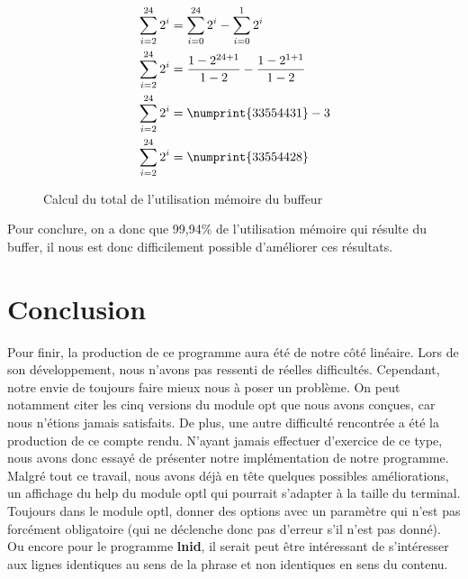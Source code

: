 \documentclass[12pt]{article}
\begin{document}
    \begin{figure}[H]
        \centering
        \begin{equation}
            \begin{split}
                & \sum_{i = 2}^{24} 2^i =  \sum_{i = 0}^{24} 2^i - 
                \sum_{i = 0}^{1} 2^i \\
                & \sum_{i = 2}^{24} 2^i = \dfrac{1 - 2^{24+1}}{1 - 2} - 
                \dfrac{1 - 2^{1+1}}{1 - 2} \\
                & \sum_{i = 2}^{24} 2^i = \numprint{33554431} - 3 \\
                & \sum_{i = 2}^{24} 2^i = \numprint{33554428} \\
            \end{split}
        \end{equation}
        \caption{Calcul du total de l'utilisation mémoire du buffeur}
    \end{figure}

    Pour conclure, on a donc que 99,94\% de l'utilisation mémoire qui résulte du
    buffer, il nous est donc difficilement possible d'améliorer ces résultats.

    \newpage

    \section{Conclusion}

    Pour finir, la production de ce programme aura été de notre côté linéaire. 
    Lors de son développement, nous n'avons pas ressenti de réelles difficultés. 
    Cependant, notre envie de toujours faire mieux nous à poser un problème. On 
    peut notamment citer les cinq versions du module opt que nous avons conçues, 
    car nous n'étions jamais satisfaits. De plus, une autre difficulté 
    rencontrée a été la production de ce compte rendu. N'ayant jamais 
    effectuer d'exercice de ce type, nous avons donc essayé de présenter notre 
    implémentation de notre programme. Malgré tout ce travail, nous avons 
    déjà en tête quelques possibles améliorations, un affichage du help du 
    module optl qui pourrait s'adapter à la taille du terminal. Toujours dans le 
    module optl, donner des options avec un paramètre qui n'est pas forcément 
    obligatoire (qui ne déclenche donc pas d'erreur s'il n'est pas donné). Ou 
    encore pour le programme \textbf{lnid}, il serait peut être intéressant de 
    s'intéresser aux lignes identiques au sens de la phrase et non identiques en 
    sens du contenu.
\end{document}
